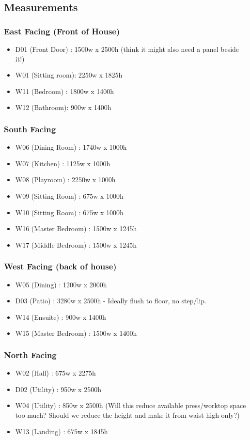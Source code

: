 \subsection{Measurements}
\subsubsection{East Facing (Front of House)}
\begin{itemize}
\item D01 (Front Door) : 1500w x 2500h (think it might also need a panel beside it!)
\item W01 (Sitting room): 2250w x 1825h
\item W11 (Bedroom) : 1800w x 1400h
\item W12 (Bathroom): 900w x 1400h
\end{itemize}    
    
\subsubsection{South Facing}
\begin{itemize}
\item W06 (Dining Room) : 1740w x 1000h
\item W07 (Kitchen) : 1125w x 1000h
\item W08 (Playroom) : 2250w x 1000h
\item W09 (Sitting Room) : 675w x 1000h
\item W10 (Sitting Room) : 675w x 1000h
\item W16 (Master Bedroom) : 1500w x 1245h
\item W17 (Middle Bedroom) : 1500w x 1245h
\end{itemize}

\subsubsection{West Facing (back of house)}
\begin{itemize}
\item W05 (Dining) : 1200w x 2000h
\item D03 (Patio) : 3280w x 2500h  - Ideally flush to floor, no step/lip.
\item W14 (Ensuite) : 900w x 1400h
\item W15 (Master Bedroom) : 1500w x 1400h    
\end{itemize}

\subsubsection{North Facing}
\begin{itemize}
\item W02 (Hall) : 675w x 2275h
\item D02 (Utility) : 950w x 2500h
\item W04 (Utility) : 850w x 2500h (Will this reduce available press/worktop space too much? 
        Should we reduce the height and make it from waist high only?)
\item W13 (Landing) : 675w x 1845h
\end{itemize}

